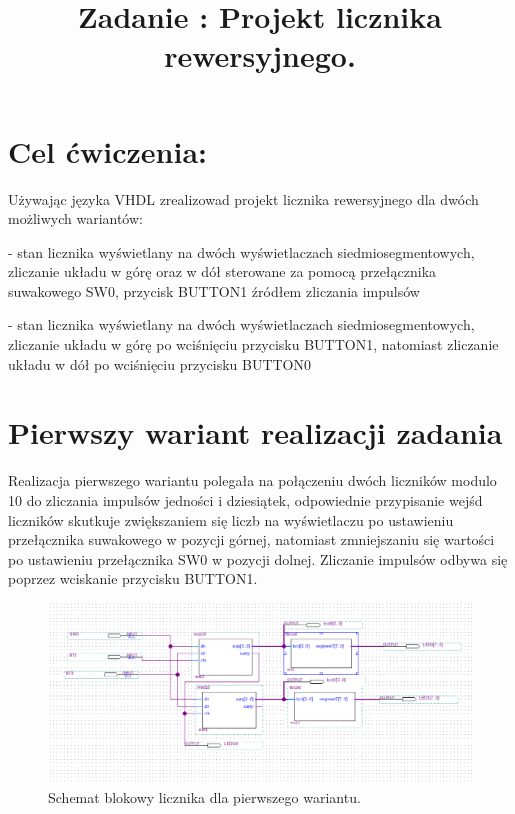 \documentclass{classrep}
\author{
  \studentinfo{Witold Olechowski}{127517} \and
  \studentinfo{Tomasz Marecik}{127374}
}
\title{Zadanie : Projekt licznika rewersyjnego.}
\begin{document}
\maketitle

\section{Cel ćwiczenia:}
Używając języka VHDL zrealizowad projekt licznika rewersyjnego dla dwóch możliwych wariantów: 

- stan licznika wyświetlany na dwóch wyświetlaczach siedmiosegmentowych, zliczanie układu w górę
oraz w dół sterowane za pomocą przełącznika suwakowego SW0, przycisk BUTTON1 źródłem
zliczania impulsów

- stan licznika wyświetlany na dwóch wyświetlaczach siedmiosegmentowych, zliczanie układu w górę
po wciśnięciu przycisku BUTTON1, natomiast zliczanie układu w dół po wciśnięciu przycisku BUTTON0


\section{Pierwszy wariant realizacji zadania}
\label{sec:pierw} %
Realizacja pierwszego wariantu polegała na połączeniu dwóch liczników modulo 10 do zliczania
impulsów jedności i dziesiątek, odpowiednie przypisanie wejśd liczników skutkuje zwiększaniem się
liczb na wyświetlaczu po ustawieniu przełącznika suwakowego w pozycji górnej, natomiast
zmniejszaniu się wartości po ustawieniu przełącznika SW0 w pozycji dolnej. Zliczanie impulsów
odbywa się poprzez wciskanie przycisku BUTTON1.

\begin{figure}[H]  %
	\centering
	\includegraphics[width=1.0\linewidth]{blok}  %
	\caption{ Schemat blokowy licznika dla pierwszego wariantu. }
	\label{fig:block_bcd_segment}
\end{figure}
\end{document}
